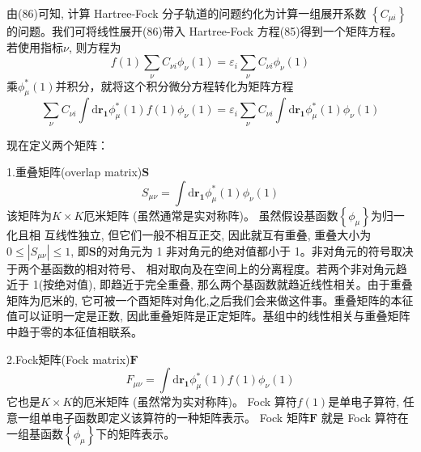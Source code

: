 \documentclass[]{article}
\begin{document}
由(86)可知, 计算 Hartree-Fock 分子轨道的问题约化为计算一组展开系数 $\left\lbrace C_{\mu i}\right\rbrace $的问题。我们可将线性展开(86)带入 Hartree-Fock 方程(85)得到一个矩阵方程。
若使用指标$\nu$, 则方程为
\begin{equation}
	f(1)\sum\limits_{\nu}C_{\nu i}\phi_{\nu}(1)=\varepsilon_i\sum\limits_{\nu}C_{\nu i}\phi_{\nu}(1)
\end{equation}
乘$\phi^*_{\mu}(1)$并积分，就将这个积分微分方程转化为矩阵方程
\begin{equation}
	\sum\limits_{\nu}C_{\nu i}\int\mathrm{d}\mathbf{r_1}\phi^*_{\mu}(1)f(1)\phi_{\nu}(1)=\varepsilon_i\sum\limits_{\nu}C_{\nu i}\int\mathrm{d}\mathbf{r_1}\phi^*_{\mu}(1)\phi_{\nu}(1)
\end{equation}

现在定义两个矩阵：

1.重叠矩阵(overlap matrix)$\mathbf{S}$
\begin{equation}
	S_{\mu\nu}=\int\mathrm{d}\mathbf{r_1}\phi^*_{\mu}(1)\phi_{\nu}(1)
\end{equation}
该矩阵为$K\times K$厄米矩阵 (虽然通常是实对称阵)。 虽然假设基函数$\left\lbrace \phi_{\mu}\right\rbrace $为归一化且相
互线性独立, 但它们一般不相互正交, 因此就互有重叠, 重叠大小为$0\leq|S_{\mu\nu}|\leq1$, 即$\mathbf{S}$的对角元为 1 非对角元的绝对值都小于 1。非对角元的符号取决于两个基函数的相对符号、
相对取向及在空间上的分离程度。若两个非对角元趋近于 1(按绝对值), 即趋近于完全重叠, 那么两个基函数就趋近线性相关。由于重叠矩阵为厄米的, 它可被一个酉矩阵对角化,之后我们会来做这件事。重叠矩阵的本征值可以证明一定是正数, 因此重叠矩阵是正定矩阵。基组中的线性相关与重叠矩阵中趋于零的本征值相联系。

2.Fock矩阵(Fock matrix)$\mathbf{F}$
\begin{equation}
	F_{\mu\nu}=\int\mathrm{d}\mathbf{r_1}\phi^*_{\mu}(1)f(1)\phi_{\nu}(1)
\end{equation}
它也是$K\times K$的厄米矩阵 (虽然常为实对称阵)。 Fock 算符$f(1)$是单电子算符, 任意一组单电子函数即定义该算符的一种矩阵表示。 Fock 矩阵$\mathbf{F}$ 就是 Fock 算符在一组基函数$\left\lbrace \phi_{\mu}\right\rbrace $下的矩阵表示。
\end{document}
